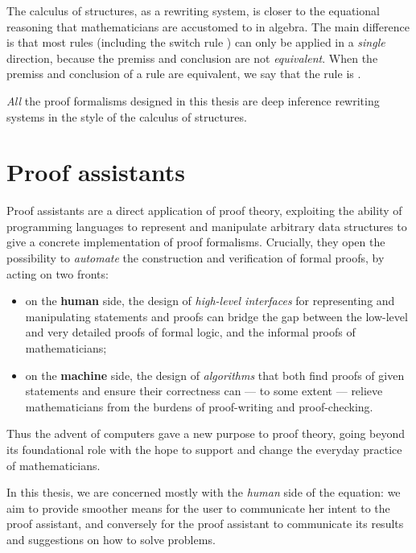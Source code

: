 The calculus of structures, as a rewriting system, is closer to the equational
reasoning that mathematicians are accustomed to in algebra. The main difference
is that most rules (including the switch rule ) can only be applied in a
\emph{single} direction, because the premiss and conclusion are not
\emph{equivalent}. When the
premiss and conclusion of a rule are equivalent, we say that the rule is
.

\begin{emphpar}
\emph{All} the proof formalisms designed in this thesis are deep inference
rewriting systems in the style of the calculus of structures.
\end{emphpar}

\section{Proof assistants}

Proof assistants are a direct application of proof theory, exploiting the
ability of programming languages to represent and manipulate arbitrary data
structures to give a concrete implementation of proof formalisms. Crucially,
they open the possibility to \emph{automate} the construction and verification
of formal proofs, by acting on two fronts:
\begin{itemize}
  \item on the \textbf{human} side, the design of \emph{high-level interfaces}
  for representing and manipulating statements and proofs can bridge the gap
  between the low-level and very detailed proofs of formal logic, and the
  informal proofs of mathematicians;
  \item on the \textbf{machine} side, the design of \emph{algorithms} that both
  find proofs of given statements and ensure their correctness can --- to some
  extent --- relieve mathematicians from the
  burdens of proof-writing and proof-checking.
\end{itemize}
Thus the advent of computers gave a new purpose to proof theory, going beyond
its foundational role with the hope to support and change the everyday practice
of mathematicians.

\begin{emphpar}
In this thesis, we are concerned mostly with the \emph{human} side of the
equation: we aim to provide smoother means for the user to communicate her
intent to the proof assistant, and conversely for the proof assistant to
communicate its results and suggestions on how to solve problems.
\end{emphpar}

